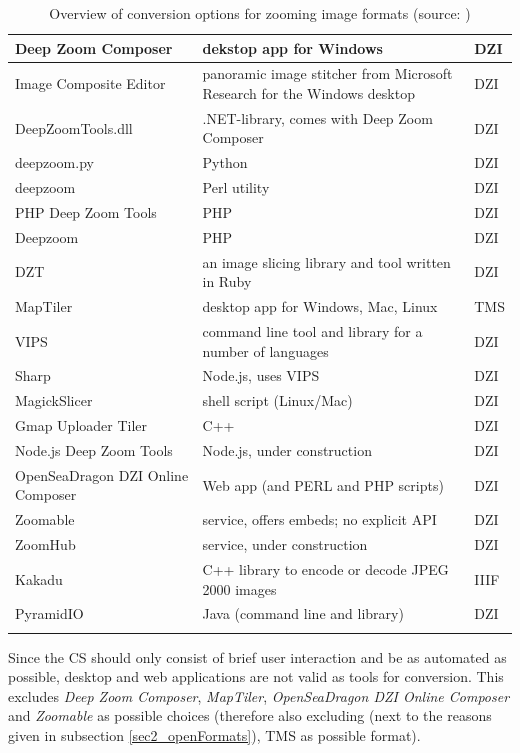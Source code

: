 \begin{longtable}{| p{3cm} | p{4cm} | p{2.5cm} |}
	\hline
	Deep Zoom Composer & dekstop app for Windows & DZI \\ \hline
	Image Composite Editor & panoramic image stitcher from Microsoft Research for the Windows desktop & DZI \\ \hline
	DeepZoomTools.dll & .NET-library, comes with Deep Zoom Composer & DZI \\ \hline
	deepzoom.py & Python & DZI \\ \hline
	deepzoom & Perl utility & DZI \\ \hline
	PHP Deep Zoom Tools & PHP & DZI \\ \hline
	Deepzoom & PHP & DZI \\ \hline
	DZT & an image slicing library and tool written in Ruby & DZI \\ \hline
	MapTiler &  desktop app for Windows, Mac, Linux & TMS \\ \hline
	VIPS & command line tool and library for a number of languages & DZI \\ \hline
	Sharp & Node.js, uses VIPS & DZI \\ \hline
	MagickSlicer & shell script (Linux/Mac) & DZI \\ \hline
	Gmap Uploader Tiler & C++ & DZI \\ \hline
	Node.js Deep Zoom Tools & Node.js, under construction & DZI \\ \hline
	OpenSeaDragon DZI Online Composer & Web app (and PERL and PHP scripts) & DZI \\ \hline
	Zoomable & service, offers embeds; no explicit API & DZI \\ \hline
	ZoomHub & service, under construction & DZI \\ \hline
	Kakadu & C++ library to encode or decode JPEG 2000 images & IIIF \\ \hline
	PyramidIO & Java (command line and library) & DZI \\ \hline
	\caption{Overview of conversion options for zooming image formats (source: \cite{web:openseadragon})}
	\label{tab3_convOptions}
\end{longtable}

Since the CS should only consist of brief user interaction and be as automated as possible, desktop and web applications are not valid as tools for conversion. This excludes \emph{Deep Zoom Composer}, \emph{MapTiler}, \emph{OpenSeaDragon DZI Online Composer} and \emph{Zoomable} as possible choices (therefore also excluding (next to the reasons given in subsection \ref{sec2_openFormats}), TMS as possible format).

